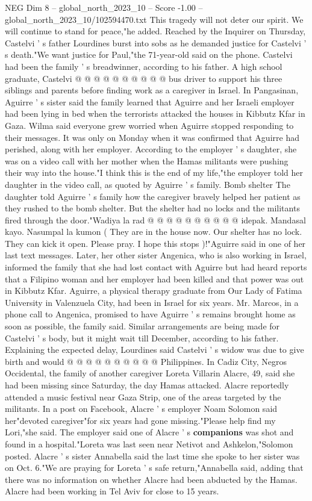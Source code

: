 \begin{textsample}{NEG Dim 8 – global\_north\_2023\_10 – Score -1.00 – global\_north\_2023\_10/102594470.txt}
This tragedy will not deter our spirit.
We will continue to stand for peace,"he added.
Reached by the Inquirer on Thursday, Castelvi ' s father Lourdines burst into sobs as he demanded justice for Castelvi ' s death."We want justice for Paul,"the 71-year-old said on the phone.
Castelvi had been the family ' s breadwinner, according to his father.
A high school graduate, Castelvi @ @ @ @ @ @ @ @ @ @ bus driver to support his three siblings and parents before finding work as a caregiver in Israel.
In Pangasinan, Aguirre ' s sister said the family learned that Aguirre and her Israeli employer had been lying in bed when the terrorists attacked the houses in Kibbutz Kfar in Gaza.
Wilma said everyone grew worried when Aguirre stopped responding to their messages.
It was only on Monday when it was confirmed that Aguirre had perished, along with her employer.
According to the employer ' s daughter, she was on a video call with her mother when the Hamas militants were pushing their way into the house."I think this is the end of my life,"the employer told her daughter in the video call, as quoted by Aguirre ' s family.
Bomb shelter The daughter told Aguirre ' s family how the caregiver bravely helped her patient as they rushed to the bomb shelter.
But the shelter had no locks and the militants fired through the door."Wadiya la rad @ @ @ @ @ @ @ @ @ @ idepak.
Mandasal kayo.
Nasumpal la kumon ( They are in the house now.
Our shelter has no lock.
They can kick it open.
Please pray.
I hope this stops )!"Aguirre said in one of her last text messages.
Later, her other sister Angenica, who is also working in Israel, informed the family that she had lost contact with Aguirre but had heard reports that a Filipino woman and her employer had been killed and that power was out in Kibbutz Kfar.
Aguirre, a physical therapy graduate from Our Lady of Fatima University in Valenzuela City, had been in Israel for six years.
Mr.
Marcos, in a phone call to Angenica, promised to have Aguirre ' s remains brought home as soon as possible, the family said.
Similar arrangements are being made for Castelvi ' s body, but it might wait till December, according to his father.
Explaining the expected delay, Lourdines said Castelvi ' s widow was due to give birth and would @ @ @ @ @ @ @ @ @ @ Philippines.
In Cadiz City, Negros Occidental, the family of another caregiver Loreta Villarin Alacre, 49, said she had been missing since Saturday, the day Hamas attacked.
Alacre reportedly attended a music festival near Gaza Strip, one of the areas targeted by the militants.
In a post on Facebook, Alacre ' s employer Noam Solomon said her"devoted caregiver"for six years had gone missing."Please help find my Lori,"she said.
The employer said one of Alacre ' s \textbf{companions} was shot and found in a hospital."Loreta was last seen near Netivot and Ashkelon,"Solomon posted.
Alacre ' s sister Annabella said the last time she spoke to her sister was on Oct. 6."We are praying for Loreta ' s safe return,"Annabella said, adding that there was no information on whether Alacre had been abducted by the Hamas.
Alacre had been working in Tel Aviv for close to 15 years.

\end{textsample}
